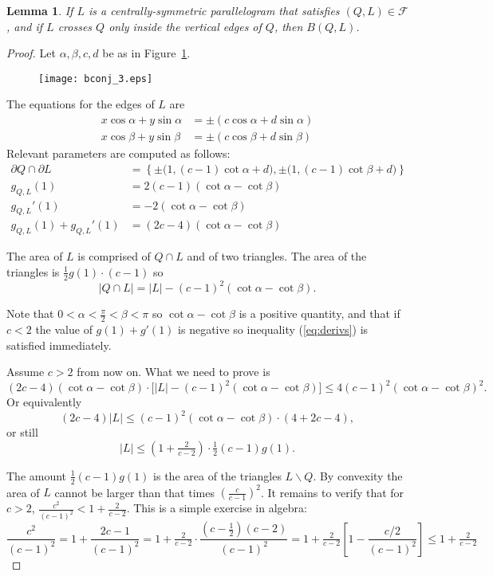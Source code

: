 \documentclass[a4paper,10pt,twoside,reqno,intlimits]{amsart}
\newtheorem*{lemma}{Lemma}
\begin{document}
\begin{lemma}
If $L$ is a centrally-symmetric parallelogram that satisfies $(Q, L) \in {\mathcal{F}}$,
and if $L$ crosses $Q$ only inside the vertical edges of $Q$, then $B(Q, L)$.
\end{lemma}
\begin{proof}
Let $\alpha, \beta, c, d$ be as in Figure~\ref{fig:lemma1}.
\begin{figure}[h!]
\texttt{[image: bconj\_3.eps]}
\caption{}
\label{fig:lemma1}
\end{figure}

The equations for the edges of $L$ are
\begin{align*}
x \cos \alpha + y \sin \alpha & = \pm (c \cos \alpha + d \sin \alpha) \\
x \cos \beta  + y \sin \beta & = \pm (c \cos \beta + d \sin \beta)
\end{align*}
Relevant parameters are computed as follows:
\begin{align*}
{\partial Q} \cap {\partial L} & = \left\{ \pm \big( 1, (c-1) \cot \alpha + d \big) , \pm \big( 1, (c-1) \cot \beta + d \big) \right\} \\
g_{Q,L}(1) & = 2(c-1)(\cot \alpha - \cot \beta) \\
g_{Q,L}'(1) & = -2(\cot \alpha - \cot \beta) \\
g_{Q,L}(1) + g_{Q,L}'(1) & = (2c-4)(\cot \alpha - \cot \beta)
\end{align*}

The area of $L$ is comprised of $Q \cap L$ and of two triangles.
The area of the triangles is $\frac{1}{2}g(1) \cdot (c-1)$ so
$$ |Q \cap L| = |L| - (c-1)^2 (\cot \alpha - \cot \beta) . $$

Note that $0 < \alpha < \frac{\pi}{2} < \beta < \pi$ so $\cot \alpha - \cot \beta$ is a positive quantity,
and that if $c < 2$ the value of $g(1) + g'(1)$ is negative so inequality (\ref{eq:derivs}) is satisfied
immediately.

Assume $c > 2$ from now on.
What we need to prove is
$$ (2c-4)(\cot \alpha - \cot \beta) \cdot \big[ |L| - (c-1)^2 (\cot \alpha - \cot \beta) \big] \le 4(c-1)^2(\cot \alpha - \cot \beta)^2 . $$
Or equivalently
$$ (2c-4)|L| \le (c-1)^2 (\cot \alpha - \cot \beta) \cdot ( 4 + 2c-4 ) , $$
or still
$$ |L| \le \left(1 + \tfrac{2}{c-2}\right) \cdot \tfrac{1}{2}(c-1)g(1) . $$

The amount $\frac{1}{2}(c-1) g(1)$ is the area of the triangles $L \backslash Q$.
By convexity the area of $L$ cannot be larger than that times $\left(\frac{c}{c-1}\right)^2$.
It remains to verify that for $c>2$, $\frac{c^2}{(c-1)^2} < 1 + \frac{2}{c-2}$. This is a
simple exercise in algebra:
$$ \frac{c^2}{(c-1)^2} = 1 + \frac{2c-1}{(c-1)^2}
= 1 + \tfrac{2}{c-2} \cdot \frac{(c-\tfrac{1}{2})(c-2)}{(c-1)^2}
= 1 + \tfrac{2}{c-2} \left[ 1 - \frac{c/2}{(c-1)^2} \right]
\le 1 + \tfrac{2}{c-2} $$
\end{proof}
\end{document}
